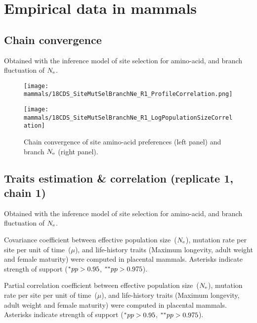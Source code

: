 \section{Empirical data in mammals}

\subsection{Chain convergence}
Obtained with the inference model of site selection for amino-acid, and branch fluctuation of $\Ne$.

\begin{figure}[H]
    \centering
    \begin{minipage}{0.49\linewidth}
        \texttt{[image: mammals/18CDS\_SiteMutSelBranchNe\_R1\_ProfileCorrelation.png]}
    \end{minipage}    \hfill
    \begin{minipage}{0.49\linewidth}
        \texttt{[image: mammals/18CDS\_SiteMutSelBranchNe\_R1\_LogPopulationSizeCorrelation]}
    \end{minipage}
    \caption[Chain convergence of site profiles and branche $\Ne$]{
    Chain convergence of site amino-acid preferences (left panel) and branch $\Ne$ (right panel).}
\end{figure}

\subsection{Traits estimation \& correlation (replicate 1, chain 1)}
Obtained with the inference model of site selection for amino-acid, and branch fluctuation of $\Ne$.

\begin{table}[H]
    
    \caption[Covariance matrix in mammals]{
    Covariance coefficient between effective population size~($\Ne$), mutation rate per site per unit of time~($\mu$), and life-history traits (Maximum longevity, adult weight and female maturity) were computed in placental mammals.
    Asterisks indicate strength of support ($\smash{^{*}} pp > 0.95$, $\smash{^{**}} pp > 0.975$).}
\end{table}

\begin{table}[H]
    
    \caption[Partial correlation coefficient matrix in mammals]{
    Partial correlation coefficient between effective population size~($\Ne$), mutation rate per site per unit of time~($\mu$), and life-history traits (Maximum longevity, adult weight and female maturity) were computed in placental mammals.
    Asterisks indicate strength of support ($\smash{^{*}} pp > 0.95$, $\smash{^{**}} pp > 0.975$).}
\end{table}

